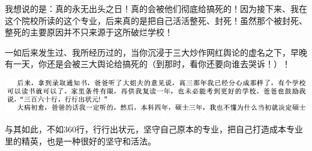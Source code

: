 \documentclass[9pt, b5paper]{article}
\begin{document}
我想说的是：真的永无出头之日！真的会被他们彻底给搞死的！因为接下来、我在这个院校所读的这个专业，后来真的是把自己活活整死、封死！虽然那个被封死、整死的主要原因并不只来源于这所破烂学校！

一如后来发生过、我所经历过的，当你沉浸于三大炒作网红舆论的虚名之下，早晚有一天，你还是会被三大舆论给搞死的（到那时，看你还要向谁去哭诉！）！

\begin{center}
\includegraphics[width=.9\linewidth]{./pic/backups_plans_20210424_092841.png}
\end{center}

与其如此，不如360行，行行出状元，坚守自己原本的专业，把自己打造成本专业里的精英，也是一种很好的坚守和活法。
\end{document}
